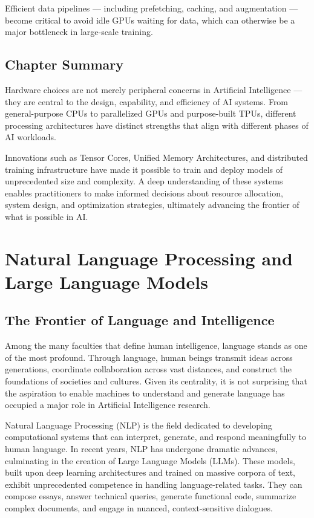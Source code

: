 \documentclass[openany]{book}
\begin{document}
Efficient data pipelines — including prefetching, caching, and augmentation — 
become critical to avoid idle GPUs waiting for data, which can otherwise be a 
major bottleneck in large-scale training.

\section{Chapter Summary}

Hardware choices are not merely peripheral concerns in Artificial Intelligence — 
they are central to the design, capability, and efficiency of AI systems. From 
general-purpose CPUs to parallelized GPUs and purpose-built TPUs, different 
processing architectures have distinct strengths that align with different 
phases of AI workloads.

Innovations such as Tensor Cores, Unified Memory Architectures, and distributed 
training infrastructure have made it possible to train and deploy models of 
unprecedented size and complexity. A deep understanding of these systems enables 
practitioners to make informed decisions about resource allocation, system 
design, and optimization strategies, ultimately advancing the frontier of what 
is possible in AI.

\chapter{Natural Language Processing and Large Language Models}

\section{The Frontier of Language and Intelligence}

Among the many faculties that define human intelligence, language stands as one 
of the most profound. Through language, human beings transmit ideas across 
generations, coordinate collaboration across vast distances, and construct the 
foundations of societies and cultures. Given its centrality, it is not 
surprising that the aspiration to enable machines to understand and generate 
language has occupied a major role in Artificial Intelligence research.

Natural Language Processing (NLP) is the field dedicated to developing 
computational systems that can interpret, generate, and respond meaningfully to 
human language. In recent years, NLP has undergone dramatic advances, 
culminating in the creation of Large Language Models (LLMs). These models, built 
upon deep learning architectures and trained on massive corpora of text, exhibit 
unprecedented competence in handling language-related tasks. They can compose 
essays, answer technical queries, generate functional code, summarize complex 
documents, and engage in nuanced, context-sensitive dialogues.
\end{document}
